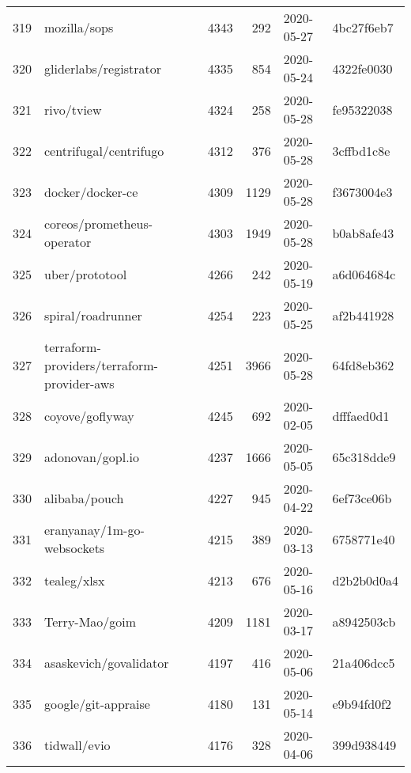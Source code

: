 \begin{longtable}{llrrll}
    319 &                                       mozilla/sops &   4343 &    292 & 2020-05-27 &  4bc27f6eb7 \\
    320 &                             gliderlabs/registrator &   4335 &    854 & 2020-05-24 &  4322fe0030 \\
    321 &                                         rivo/tview &   4324 &    258 & 2020-05-28 &  fe95322038 \\
    322 &                             centrifugal/centrifugo &   4312 &    376 & 2020-05-28 &  3cffbd1c8e \\
    323 &                                   docker/docker-ce &   4309 &   1129 & 2020-05-28 &  f3673004e3 \\
    324 &                         coreos/prometheus-operator &   4303 &   1949 & 2020-05-28 &  b0ab8afe43 \\
    325 &                                     uber/prototool &   4266 &    242 & 2020-05-19 &  a6d064684c \\
    326 &                                  spiral/roadrunner &   4254 &    223 & 2020-05-25 &  af2b441928 \\
    327 &         terraform-providers/terraform-provider-aws &   4251 &   3966 & 2020-05-28 &  64fd8eb362 \\
    328 &                                    coyove/goflyway &   4245 &    692 & 2020-02-05 &  dfffaed0d1 \\
    329 &                                   adonovan/gopl.io &   4237 &   1666 & 2020-05-05 &  65c318dde9 \\
    330 &                                      alibaba/pouch &   4227 &    945 & 2020-04-22 &  6ef73ce06b \\
    331 &                         eranyanay/1m-go-websockets &   4215 &    389 & 2020-03-13 &  6758771e40 \\
    332 &                                        tealeg/xlsx &   4213 &    676 & 2020-05-16 &  d2b2b0d0a4 \\
    333 &                                     Terry-Mao/goim &   4209 &   1181 & 2020-03-17 &  a8942503cb \\
    334 &                             asaskevich/govalidator &   4197 &    416 & 2020-05-06 &  21a406dcc5 \\
    335 &                                google/git-appraise &   4180 &    131 & 2020-05-14 &  e9b94fd0f2 \\
    336 &                                       tidwall/evio &   4176 &    328 & 2020-04-06 &  399d938449 \\

\end{longtable}
